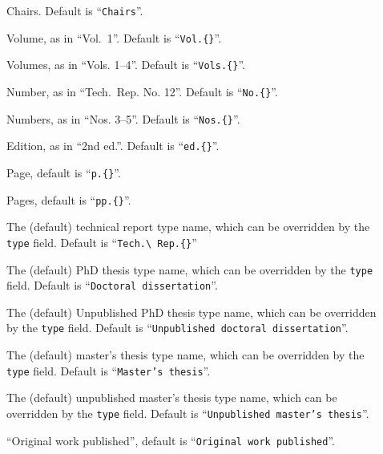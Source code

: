 \documentclass{article}
\newcommand{\fieldname}[1]{\texttt{#1}}%
\newcommand{\cmd}[1]{\texttt{\string#1}}%
\begin{document}
\begin{description}
  \item[\cmd{\BCHAIRS}] Chairs. Default is ``\verb+Chairs+''.

  \item[\cmd{\BVOL}] Volume, as in ``Vol.\ 1''.
      Default is ``\verb+Vol.{}+''.

  \item[\cmd{\BVOLS}] Volumes, as in ``Vols.{} 1--4''.
      Default is ``\verb+Vols.{}+''.

  \item[\cmd{\BNUM}] Number, as in ``Tech.\ Rep.{} No.{} 12''.
      Default is ``\verb+No.{}+''.

  \item[\cmd{\BNUMS}] Numbers, as in ``Nos.{} 3--5''.
      Default is ``\verb+Nos.{}+''.

  \item[\cmd{\BEd}] Edition, as in ``2nd ed.{}''.
      Default is ``\verb+ed.{}+''.

  \item[\cmd{\BPG}] Page, default is ``\verb+p.{}+''.

  \item[\cmd{\BPGS}] Pages, default is ``\verb+pp.{}+''.

  \item[\cmd{\BTR}] The (default) technical report type name, which can be
      overridden by the \fieldname{type} field. Default is
      ``\verb+Tech.\ Rep.{}+''

  \item[\cmd{\BPhD}] The (default) PhD thesis type name, which can be
      overridden by the \fieldname{type} field. Default is
      ``\texttt{Doctoral dissertation}''.

  \item[\cmd{\BUPhD}] The (default) Unpublished PhD thesis type name,
      which can be overridden by the \fieldname{type} field. Default is
      ``\texttt{Unpublished doctoral dissertation}''.

  \item[\cmd{\BMTh}] The (default) master's thesis type name, which can be
      overridden by the \fieldname{type} field. Default is
      ``\texttt{Master's thesis}''.

  \item[\cmd{\BUMTh}] The (default) unpublished master's thesis type name,
      which can be overridden by the \fieldname{type} field. Default is
      ``\texttt{Unpublished master's thesis}''.

  \item[\cmd{\BOWP}] ``Original work published'', default is
      ``\texttt{Original work published}''.


\end{description}
\end{document}
